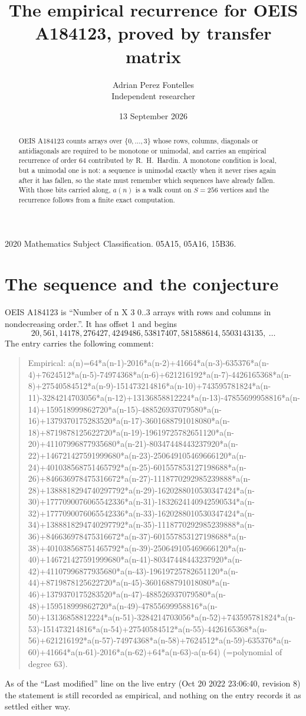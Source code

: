 \documentclass[11pt,a4paper]{article}
\title{The empirical recurrence for OEIS A184123, proved by transfer matrix}
\author{Adrian Perez Fontelles\\ \small Independent researcher}
\date{13 September 2026}
\theoremstyle{plain}
\theoremstyle{definition}
\begin{document}
\maketitle

\begin{abstract}
OEIS A184123 counts arrays over $\{0,\dots,3\}$ whose rows, columns, diagonals or
antidiagonals are required to be monotone or unimodal, and carries an empirical recurrence of
order $64$ contributed by R.~H.~Hardin. A monotone condition is local, but a unimodal one
is not: a sequence is unimodal exactly when it never rises again after it has fallen, so the
state must remember which sequences have already fallen. With those bits carried along, $a(n)$
is a walk count on $S=256$ vertices and the recurrence follows from a finite exact
computation.
\end{abstract}

\noindent\small 2020 Mathematics Subject Classification. 05A15, 05A16, 15B36.\normalsize

\section{The sequence and the conjecture}

OEIS A184123 is ``Number of n X 3 0..3 arrays with rows and columns in nondecreasing order.''. It has offset $1$ and begins
\[
20, 561, 14178, 276427, 4249486, 53817407, 581588614, 5503143135,\ \dots
\]
The entry carries the following comment:
\begin{quote}\small
Empirical: a(n)=64*a(n-1)-2016*a(n-2)+41664*a(n-3)-635376*a(n-4)+7624512*a(n-5)-74974368*a(n-6)+621216192*a(n-7)-4426165368*a(n-8)+27540584512*a(n-9)-151473214816*a(n-10)+743595781824*a(n-11)-3284214703056*a(n-12)+13136858812224*a(n-13)-47855699958816*a(n-14)+159518999862720*a(n-15)-488526937079580*a(n-16)+1379370175283520*a(n-17)-3601688791018080*a(n-18)+8719878125622720*a(n-19)-19619725782651120*a(n-20)+41107996877935680*a(n-21)-80347448443237920*a(n-22)+146721427591999680*a(n-23)-250649105469666120*a(n-24)+401038568751465792*a(n-25)-601557853127198688*a(n-26)+846636978475316672*a(n-27)-1118770292985239888*a(n-28)+1388818294740297792*a(n-29)-1620288010530347424*a(n-30)+1777090076065542336*a(n-31)-1832624140942590534*a(n-32)+1777090076065542336*a(n-33)-1620288010530347424*a(n-34)+1388818294740297792*a(n-35)-1118770292985239888*a(n-36)+846636978475316672*a(n-37)-601557853127198688*a(n-38)+401038568751465792*a(n-39)-250649105469666120*a(n-40)+146721427591999680*a(n-41)-80347448443237920*a(n-42)+41107996877935680*a(n-43)-19619725782651120*a(n-44)+8719878125622720*a(n-45)-3601688791018080*a(n-46)+1379370175283520*a(n-47)-488526937079580*a(n-48)+159518999862720*a(n-49)-47855699958816*a(n-50)+13136858812224*a(n-51)-3284214703056*a(n-52)+743595781824*a(n-53)-151473214816*a(n-54)+27540584512*a(n-55)-4426165368*a(n-56)+621216192*a(n-57)-74974368*a(n-58)+7624512*a(n-59)-635376*a(n-60)+41664*a(n-61)-2016*a(n-62)+64*a(n-63)-a(n-64) (=polynomial of degree 63).
\end{quote}
As of the ``Last modified'' line on the live entry (Oct 20 2022 23:06:40, revision 8) the statement is
still recorded as empirical, and nothing on the entry records it as settled either way.
\end{document}
